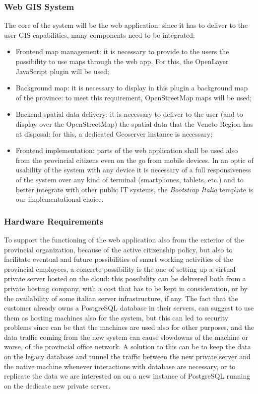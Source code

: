 \subsubsection{Web GIS System}
The core of the system will be the web application: since it has to deliver to the user GIS capabilities, many components need to be integrated:
\begin{itemize}
    \item Frontend map management: it is necessary to provide to the users the possibility to use maps through the web app. For this, the OpenLayer JavaScript plugin will be used;
    \item Background map: it is necessary to display in this plugin a background map of the province: to meet this requirement, OpenStreetMap maps will be used;
    \item Backend spatial data delivery: it is necessary to deliver to the user (and to display over the OpenStreetMap) the spatial data that the Veneto Region has at disposal: for this, a dedicated Geoserver instance is necessary;
    \item Frontend implementation: parts of the web application shall be used also from the provincial citizens even on the go from mobile devices. In an optic of usability of the system with any device it is necessary of a full responsiveness of the system over any kind of terminal (smartphones, tablets, etc.) and to better integrate with other public IT systems, the \textit{Bootstrap Italia} template is our implementational choice.
\end{itemize}

\subsubsection{Hardware Requirements}
To support the functioning of the web application also from the exterior of the provincial organization, because of the active citizenship policy, but also to facilitate eventual and future possibilities of smart working activities of the provincial employees, a concrete possibility is the one of setting up a virtual private server hosted on the cloud: this possibility can be delivered both from a private hosting company, with a cost that has to be kept in consideration, or by the availability of some italian server infrastructure, if any.
The fact that the customer already owns a PostgreSQL database in their servers, can suggest to use them as hosting machines also for the system, but this can led to security problems since can be that the machines are used also for other purposes, and the data traffic coming from the new system can cause slowdowns of the machine or worse, of the provincial office network. A solution to this can be to keep the data on the legacy database and tunnel the traffic between the new private server and the native machine whenever interactions with database are necessary, or to replicate the data we are interested on on a new instance of PostgreSQL running on the dedicate new private server.

